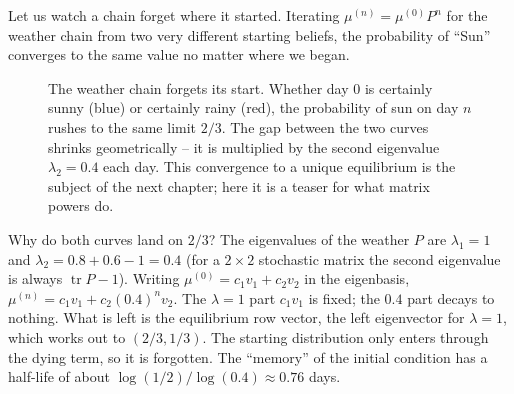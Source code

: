 Let us watch a chain forget where it started. Iterating $\mu^{(n)} = \mu^{(0)}P^n$ for the
weather chain from two very different starting beliefs, the probability of ``Sun'' converges
to the same value no matter where we began.

\begin{figure}[H]
\centering
{}
\caption{The weather chain forgets its start. Whether day $0$ is certainly sunny (blue) or
certainly rainy (red), the probability of sun on day $n$ rushes to the same limit
$2/3$. The gap between the two curves shrinks geometrically -- it is multiplied by the
second eigenvalue $\lambda_2 = 0.4$ each day. This convergence to a unique equilibrium is the
subject of the next chapter; here it is a teaser for what matrix powers do.}
\label{ch23:fig-weather-converge}
\end{figure}

\begin{happeningbox}
Why do both curves land on $2/3$? The eigenvalues of the weather $P$ are $\lambda_1 = 1$ and
$\lambda_2 = 0.8 + 0.6 - 1 = 0.4$ (for a $2\times2$ stochastic matrix the second eigenvalue is
always $\operatorname{tr}P - 1$). Writing $\mu^{(0)} = c_1 v_1 + c_2 v_2$ in the eigenbasis,
$\mu^{(n)} = c_1 v_1 + c_2 (0.4)^n v_2$. The $\lambda=1$ part $c_1 v_1$ is fixed; the $0.4$
part decays to nothing. What is left is the equilibrium row vector, the left eigenvector for
$\lambda = 1$, which works out to $(2/3, 1/3)$. The starting distribution only enters through
the dying term, so it is forgotten. The ``memory'' of the initial condition has a half-life of
about $\log(1/2)/\log(0.4) \approx 0.76$ days.
\end{happeningbox}

